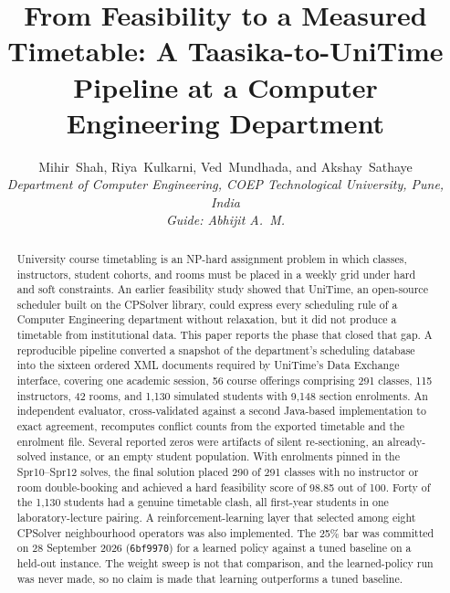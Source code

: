 \documentclass[journal]{IEEEtran}
\begin{document}
\title{From Feasibility to a Measured Timetable: A Taasika-to-UniTime Pipeline at a Computer Engineering Department}

\author{Mihir~Shah, Riya~Kulkarni, Ved~Mundhada, and Akshay~Sathaye\\
\textit{Department of Computer Engineering, COEP Technological University, Pune, India}\\
\textit{Guide: Abhijit A.\ M.}}


\maketitle

\begin{abstract}
University course timetabling is an NP-hard assignment problem in which classes, instructors, student cohorts, and rooms must be placed in a weekly grid under hard and soft constraints. An earlier feasibility study showed that UniTime, an open-source scheduler built on the CPSolver library, could express every scheduling rule of a Computer Engineering department without relaxation, but it did not produce a timetable from institutional data. This paper reports the phase that closed that gap. A reproducible pipeline converted a snapshot of the department’s scheduling database into the sixteen ordered XML documents required by UniTime’s Data Exchange interface, covering one academic session, 56 course offerings comprising 291 classes, 115 instructors, 42 rooms, and 1,130 simulated students with 9,148 section enrolments. An independent evaluator, cross-validated against a second Java-based implementation to exact agreement, recomputes conflict counts from the exported timetable and the enrolment file. Several reported zeros were artifacts of silent re-sectioning, an already-solved instance, or an empty student population. With enrolments pinned in the Spr10--Spr12 solves, the final solution placed 290 of 291 classes with no instructor or room double-booking and achieved a hard feasibility score of 98.85 out of 100. Forty of the 1,130 students had a genuine timetable clash, all first-year students in one laboratory-lecture pairing. A reinforcement-learning layer that selected among eight CPSolver neighbourhood operators was also implemented. The 25\% bar was committed on 28 September 2026 (\texttt{6bf9970}) for a learned policy against a tuned baseline on a held-out instance. The weight sweep is not that comparison, and the learned-policy run was never made, so no claim is made that learning outperforms a tuned baseline.
\end{abstract}
\end{document}
